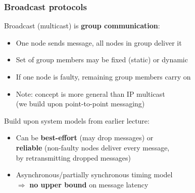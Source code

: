 \begin{frame}
    \label{s:broadcast-intro}
    \frametitle{Broadcast protocols}
    Broadcast (multicast) is \textbf{group communication}:
    \begin{itemize}
        \item One node sends message, all nodes in group deliver it\pause
        \item Set of group members may be fixed (static) or dynamic\pause
        \item If one node is faulty, remaining group members carry on\pause
        \item Note: concept is more general than IP multicast\\
            (we build upon point-to-point messaging)\\[1em]\pause
    \end{itemize}
    Build upon system models from earlier lecture:
    \begin{itemize}
        \item Can be \textbf{best-effort} (may drop messages) or \\
            \textbf{reliable} (non-faulty nodes deliver every message,\\
            by retransmitting dropped messages)\pause
        \item Asynchronous/partially synchronous timing model\\
            $\Longrightarrow$ \textbf{no upper bound} on message latency
    \end{itemize}
\end{frame}
\label{l:broadcast-intro}


